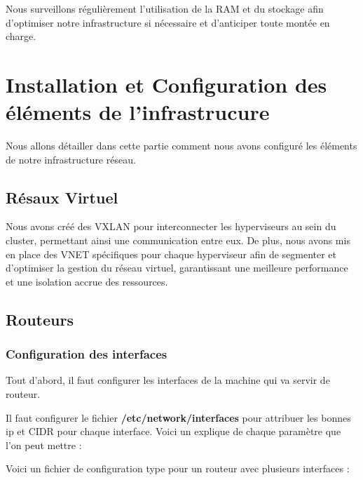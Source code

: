 \documentclass{article}
\begin{document}
Nous surveillons régulièrement l’utilisation de la RAM et du stockage afin d’optimiser notre infrastructure si nécessaire et d’anticiper toute montée en charge.

\section{Installation et Configuration des éléments de l'infrastrucure}
Nous allons détailler dans cette partie comment nous avons configuré les éléments de notre infrastructure réseau.
\subsection{Résaux Virtuel}

Nous avons créé des VXLAN pour interconnecter les hyperviseurs au sein du cluster, permettant ainsi une communication entre eux. De plus, nous avons mis en place des VNET spécifiques pour chaque hyperviseur afin de segmenter et d’optimiser la gestion du réseau virtuel, garantissant une meilleure performance et une isolation accrue des ressources.

\subsection{Routeurs}
\subsubsection{Configuration des interfaces}
Tout d'abord, il faut configurer les interfaces de la machine qui va servir de routeur.

Il faut configurer le fichier \textbf{/etc/network/interfaces} pour attribuer les bonnes ip et CIDR pour chaque interface. Voici un explique de chaque paramètre que l’on peut mettre :

\newpage



Voici un fichier de configuration type pour un routeur avec plusieurs interfaces :
\end{document}

